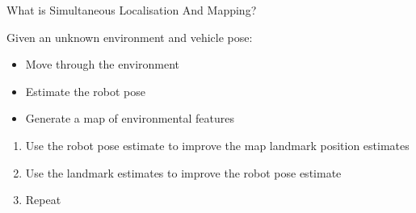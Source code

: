 \documentclass[compress,xcolor=table]{beamer}
\begin{document}
\begin{frame}{What is Simultaneous Localisation And Mapping?}

    Given an unknown environment and vehicle pose:

    \begin{itemize}
        \item Move through the environment
        \item Estimate the robot pose
        \item Generate a map of environmental features
    \end{itemize}

    \pause
    \begin{enumerate}
        \item Use the robot pose estimate to improve the map landmark position
            estimates

        \item Use the landmark estimates to improve the robot pose estimate

        \item Repeat
    \end{enumerate}
\end{frame}
\end{document}
